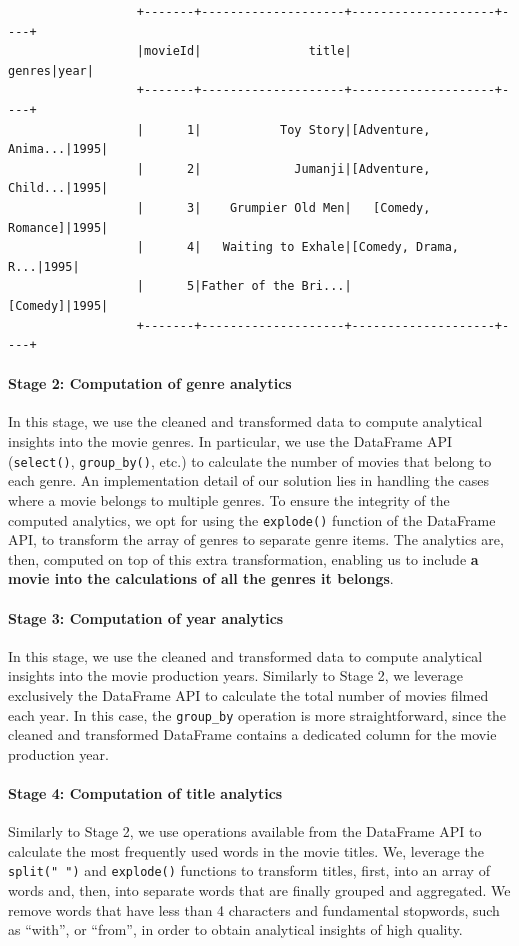 \documentclass[acmlarge]{acmart}
\begin{document}
\begin{verbatim}
                  +-------+--------------------+--------------------+----+
                  |movieId|               title|              genres|year|
                  +-------+--------------------+--------------------+----+
                  |      1|           Toy Story|[Adventure, Anima...|1995|
                  |      2|             Jumanji|[Adventure, Child...|1995|
                  |      3|    Grumpier Old Men|   [Comedy, Romance]|1995|
                  |      4|   Waiting to Exhale|[Comedy, Drama, R...|1995|
                  |      5|Father of the Bri...|            [Comedy]|1995|
                  +-------+--------------------+--------------------+----+
\end{verbatim}

\paragraph{Stage 2: Computation of genre analytics} In this stage, we use the cleaned and transformed data to compute analytical insights into the movie genres. In particular, we use the DataFrame API (\texttt{select()}, \texttt{group\_by()}, etc.) to calculate the number of movies that belong to each genre. An implementation detail of our solution lies in handling the cases where a movie belongs to multiple genres. To ensure the integrity of the computed analytics, we opt for using the \texttt{explode()} function of the DataFrame API, to transform the array of genres to separate genre items. The analytics are, then, computed on top of this extra transformation, enabling us to include \textbf{a movie into the calculations of all the genres it belongs}.

\paragraph{Stage 3: Computation of year analytics} In this stage, we use the cleaned and transformed data to compute analytical insights into the movie production years. Similarly to Stage 2, we leverage exclusively the DataFrame API to calculate the total number of movies filmed each year. In this case, the \texttt{group\_by} operation is more straightforward, since the cleaned and transformed DataFrame contains a dedicated column for the movie production year.

\paragraph{Stage 4: Computation of title analytics} Similarly to Stage 2, we use operations available from the DataFrame API to calculate the most frequently used words in the movie titles. We, leverage the \texttt{split(" ")} and \texttt{explode()} functions to transform titles, first, into an array of words and, then, into separate words that are finally grouped and aggregated. We remove words that have less than 4 characters and fundamental stopwords, such as ``with'', or ``from'', in order to obtain analytical insights of high quality.
\end{document}
